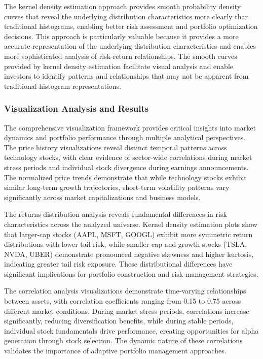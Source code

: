\documentclass[12pt,a4paper]{article}
\begin{document}
The kernel density estimation approach provides smooth probability density curves that reveal the underlying distribution characteristics more clearly than traditional histograms, enabling better risk assessment and portfolio optimization decisions. This approach is particularly valuable because it provides a more accurate representation of the underlying distribution characteristics and enables more sophisticated analysis of risk-return relationships. The smooth curves provided by kernel density estimation facilitate visual analysis and enable investors to identify patterns and relationships that may not be apparent from traditional histogram representations.

\subsubsection{Visualization Analysis and Results}

The comprehensive visualization framework provides critical insights into market dynamics and portfolio performance through multiple analytical perspectives. The price history visualizations reveal distinct temporal patterns across technology stocks, with clear evidence of sector-wide correlations during market stress periods and individual stock divergence during earnings announcements. The normalized price trends demonstrate that while technology stocks exhibit similar long-term growth trajectories, short-term volatility patterns vary significantly across market capitalizations and business models.

The returns distribution analysis reveals fundamental differences in risk characteristics across the analyzed universe. Kernel density estimation plots show that larger-cap stocks (AAPL, MSFT, GOOGL) exhibit more symmetric return distributions with lower tail risk, while smaller-cap and growth stocks (TSLA, NVDA, UBER) demonstrate pronounced negative skewness and higher kurtosis, indicating greater tail risk exposure. These distributional differences have significant implications for portfolio construction and risk management strategies.

The correlation analysis visualizations demonstrate time-varying relationships between assets, with correlation coefficients ranging from 0.15 to 0.75 across different market conditions. During market stress periods, correlations increase significantly, reducing diversification benefits, while during stable periods, individual stock fundamentals drive performance, creating opportunities for alpha generation through stock selection. The dynamic nature of these correlations validates the importance of adaptive portfolio management approaches.
\end{document}
